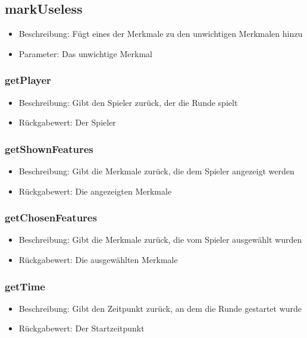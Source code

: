\documentclass[a4paper]{scrreprt}
\begin{document}
   \subsection{markUseless}
      \begin{itemize}
      \item Beschreibung: Fügt eines der Merkmale zu den unwichtigen Merkmalen hinzu
      \item Parameter: Das unwichtige Merkmal
      \end{itemize}
   \subsubsection{getPlayer}
      \begin{itemize}
          \item Beschreibung: Gibt den Spieler zurück, der die Runde spielt
          \item Rückgabewert: Der Spieler
      \end{itemize}
   \subsubsection{getShownFeatures}
      \begin{itemize}
          \item Beschreibung: Gibt die Merkmale zurück, die dem Spieler angezeigt werden
          \item Rückgabewert: Die angezeigten Merkmale
      \end{itemize}
   \subsubsection{getChosenFeatures}
      \begin{itemize}
          \item Beschreibung: Gibt die Merkmale zurück, die vom Spieler ausgewählt wurden
          \item Rückgabewert: Die ausgewählten Merkmale
      \end{itemize}
   \subsubsection{getTime}
      \begin{itemize}
          \item Beschreibung: Gibt den Zeitpunkt zurück, an dem die Runde gestartet wurde
          \item Rückgabewert: Der Startzeitpunkt 
      \end{itemize}
\end{document}

